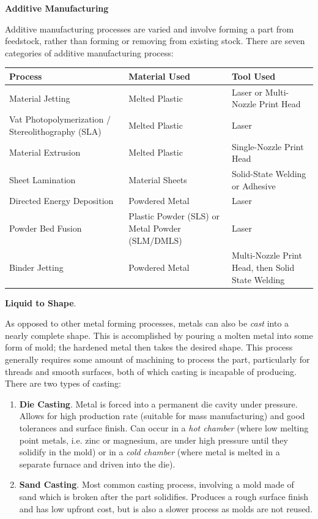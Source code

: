 \textbf{Additive Manufacturing}

Additive manufacturing processes are varied and involve forming a part from feedstock, rather than forming or removing from existing stock. There are seven categories of additive manufacturing process:

\begin{center}
    \begin{tabular}{ | m{2in} | m{2in} | m{2in} | }
    \hline
    Process & Material Used & Tool Used\\
    \hline
    Material Jetting & Melted Plastic & Laser or Multi-Nozzle Print Head\\
    \hline
    Vat Photopolymerization / Stereolithography (SLA) & Melted Plastic & Laser\\
    \hline
    Material Extrusion & Melted Plastic & Single-Nozzle Print Head\\
    \hline
    Sheet Lamination & Material Sheets & Solid-State Welding or Adhesive\\
    \hline
    Directed Energy Deposition & Powdered Metal & Laser \\
    \hline
    Powder Bed Fusion & Plastic Powder (SLS) or Metal Powder (SLM/DMLS) & Laser\\
    \hline
    Binder Jetting & Powdered Metal & Multi-Nozzle Print Head, then Solid State Welding\\
    \hline
    \end{tabular}
\end{center}

\textbf{Liquid to Shape}.

As opposed to other metal forming processes, metals can also be \textit{cast} into a nearly complete shape. This is accomplished by pouring a molten metal into some form of mold; the hardened metal then takes the desired shape. This process generally requires some amount of machining to process the part, particularly for threads and smooth surfaces, both of which casting is incapable of producing. There are two types of casting: \begin{enumerate}
    \item[] \textbf{Die Casting}. Metal is forced into a permanent die cavity under pressure. Allows for high production rate (suitable for mass manufacturing) and good tolerances and surface finish. Can occur in a \textit{hot chamber} (where low melting point metals, i.e. zinc or magnesium, are under high pressure until they solidify in the mold) or in a \textit{cold chamber} (where metal is melted in a separate furnace and driven into the die). 
    \item[] \textbf{Sand Casting}. Most common casting process, involving a mold made of sand which is broken after the part solidifies. Produces a rough surface finish and has low upfront cost, but is also a slower process as molds are not reused.
\end{enumerate}

